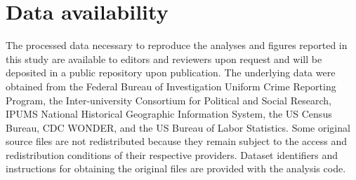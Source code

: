 \section*{Data availability}

The processed data necessary to reproduce the analyses and figures reported in this study are available to editors and reviewers upon request and will be deposited in a public repository upon publication. The underlying data were obtained from the Federal Bureau of Investigation Uniform Crime Reporting Program, the Inter-university Consortium for Political and Social Research, IPUMS National Historical Geographic Information System, the US Census Bureau, CDC WONDER, and the US Bureau of Labor Statistics. Some original source files are not redistributed because they remain subject to the access and redistribution conditions of their respective providers. Dataset identifiers and instructions for obtaining the original files are provided with the analysis code.

